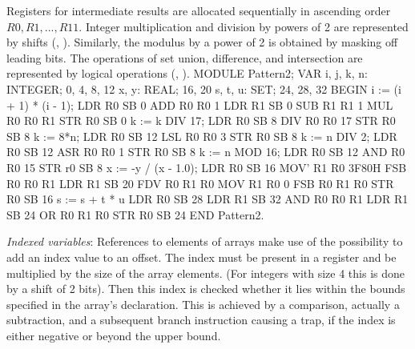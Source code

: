 Registers for intermediate results are allocated sequentially in ascending order $R0, R1, ... , R11$. Integer multiplication and division by powers of 2 are represented by shifts (, ). Similarly, the modulus by a power of 2 is obtained by masking off leading bits. The operations of set union, difference, and intersection are represented by logical operations (, ).
\begintt
MODULE Pattern2;
  VAR i, j, k, n: INTEGER;      0, 4, 8, 12
    x, y: REAL;                 16, 20
    s, t, u: SET;               24, 28, 32
BEGIN
  i := (i + 1) * (i - 1);       LDR  R0 SB 0
                                ADD  R0 R0 1
                                LDR  R1 SB 0
                                SUB  R1 R1 1
                                MUL  R0 R0 R1
                                STR  R0 SB 0
  k := k DIV 17;                LDR  R0 SB 8
                                DIV  R0 R0 17
                                STR  R0 SB 8
  k := 8*n;                     LDR  R0 SB 12
                                LSL  R0 R0 3
                                STR  R0 SB 8
  k := n DIV 2;                 LDR  R0 SB 12
                                ASR  R0 R0 1
                                STR  R0 SB 8
  k := n MOD 16;                LDR  R0 SB 12
                                AND  R0 R0 15
                                STR  r0 SB 8
  x := -y / (x - 1.0);          LDR  R0 SB 16
                                MOV' R1 R0 3F80H
                                FSB  R0 R0 R1
                                LDR  R1 SB 20
                                FDV  R0 R1 R0
                                MOV  R1 R0 0
                                FSB  R0 R1 R0
                                STR  R0 SB 16
  s := s + t * u                LDR  R0 SB 28
                                LDR  R1 SB 32
                                AND  R0 R0 R1
                                LDR  R1 SB 24
                                OR   R0 R1 R0
                                STR  R0 SB 24
END Pattern2.
\endtt

\noindent {} \emph{Indexed variables}: References to elements of arrays make use of the possibility to add an index value to an offset. The index must be present in a register and be multiplied by the size of the array elements. (For integers with size 4 this is done by a shift of 2 bits). Then this index is checked whether it lies within the bounds specified in the array's declaration. This is achieved by a comparison, actually a subtraction, and a subsequent branch instruction causing a trap, if the index is either negative or beyond the upper bound.

